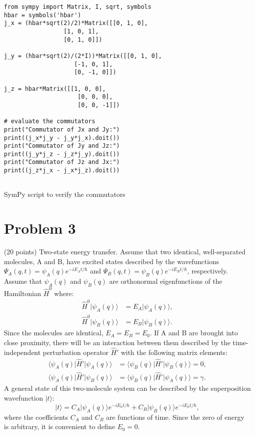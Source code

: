 \documentclass{article}
\begin{document}
\begin{algorithm}[H]
\SetAlgoLined
{}
\begin{verbatim}
from sympy import Matrix, I, sqrt, symbols
hbar = symbols('hbar')
j_x = (hbar*sqrt(2)/2)*Matrix([[0, 1, 0],
                 [1, 0, 1],
                 [0, 1, 0]])

j_y = (hbar*sqrt(2)/(2*I))*Matrix([[0, 1, 0],
                    [-1, 0, 1],
                    [0, -1, 0]])

j_z = hbar*Matrix([[1, 0, 0],
                     [0, 0, 0],
                     [0, 0, -1]])

# evaluate the commutators
print("Commutator of Jx and Jy:")
print((j_x*j_y - j_y*j_x).doit())
print("Commutator of Jy and Jz:")
print((j_y*j_z - j_z*j_y).doit())
print("Commutator of Jz and Jx:")
print((j_z*j_x - j_x*j_z).doit())


\end{verbatim}
\caption{SymPy script to verify the commutators}
\end{algorithm}
\section{Problem 3}
(20 points) Two-state energy transfer. Assume that two identical, well-separated molecules, A and B, have excited states described by the wavefunctions \(\Psi_A(q, t) = \psi_A(q)e^{-iE_At/\hbar}\) and \(\Psi_B(q, t) = \psi_B(q)e^{-iE_Bt/\hbar}\), respectively. Assume that \(\psi_A(q)\) and \(\psi_B(q)\) are orthonormal eigenfunctions of the Hamiltonian \(\hat{H}^0\) where:
\begin{align*}
\hat{H}^0 \lvert \psi_A(q) \rangle &= E_A \lvert \psi_A(q) \rangle, \\
\hat{H}^0 \lvert \psi_B(q) \rangle &= E_B \lvert \psi_B(q) \rangle.
\end{align*}
Since the molecules are identical, \(E_A = E_B = E_0\). If A and B are brought into close proximity, there will be an interaction between them described by the time-independent perturbation operator \(\hat{H}'\) with the following matrix elements:
\begin{align*}
\langle \psi_A(q) \lvert \hat{H}' \lvert \psi_A(q) \rangle &= \langle \psi_B(q) \lvert \hat{H}' \lvert \psi_B(q) \rangle = 0, \\
\langle \psi_A(q) \lvert \hat{H}' \lvert \psi_B(q) \rangle &= \langle \psi_B(q) \lvert \hat{H}' \lvert \psi_A(q) \rangle = \gamma.
\end{align*}
A general state of this two-molecule system can be described by the superposition wavefunction \( \lvert t \rangle \):
\[
\lvert t \rangle = C_A \lvert \psi_A(q) \rangle e^{-iE_0t/\hbar} + C_B \lvert \psi_B(q) \rangle e^{-iE_0t/\hbar},
\]
where the coefficients \(C_A\) and \(C_B\) are functions of time. Since the zero of energy is arbitrary, it is convenient to define \(E_0 = 0\).
\end{document}
